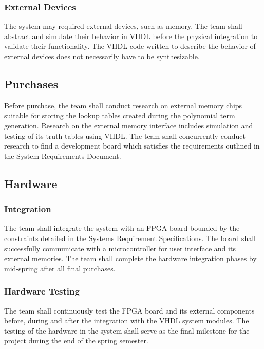 \documentclass[12pt]{extarticle}
\begin{document}
            \subsubsection{External Devices} The system may required external
            devices, such as memory. The team shall abstract and simulate their
            behavior in VHDL before the physical integration to validate their
            functionality. The VHDL code written to describe the behavior of
            external devices does not necessarily have to be synthesizable.

        \subsection{Purchases} Before purchase, the team shall conduct research
        on external memory chips suitable for storing the lookup tables created
        during the polynomial term generation. Research on the external memory
        interface includes simulation and testing of its truth tables using
        VHDL. The team shall concurrently conduct research to find a development
        board which satisfies the requirements outlined in the System
        Requirements Document.

        \subsection{Hardware}

            \subsubsection{Integration} The team shall integrate the system
            with an FPGA board bounded by the constraints detailed in the
            Systems Requirement Specifications. The board shall successfully
            communicate with a microcontroller for user interface and its
            external memories. The team shall complete the hardware integration
            phases by mid-spring after all final purchases.

            \subsubsection{Hardware Testing} The team shall continuously test
            the FPGA board and its external components before, during and
            after the integration with the VHDL system modules. The testing of
            the hardware in the system shall serve as the final milestone for
            the project during the end of the spring semester.
\end{document}
